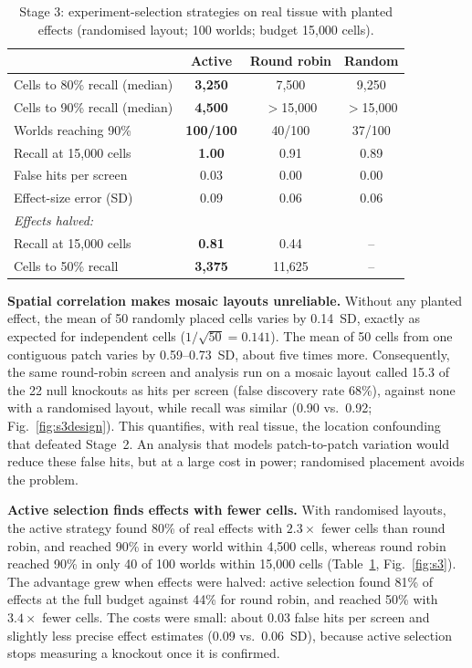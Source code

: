 \documentclass[journal]{IEEEtran}
\begin{document}
\begin{table}[!t]
\centering
\caption{Stage 3: experiment-selection strategies on real tissue with planted effects (randomised layout; 100 worlds; budget 15{,}000 cells).}
\label{tab:s3}
\footnotesize
\setlength{\tabcolsep}{3pt}
\begin{tabular}{lccc}
\toprule
 & Active & Round robin & Random \\
\midrule
Cells to 80\% recall (median) & \textbf{3{,}250} & 7{,}500 & 9{,}250 \\
Cells to 90\% recall (median) & \textbf{4{,}500} & $>$15{,}000 & $>$15{,}000 \\
Worlds reaching 90\% & \textbf{100/100} & 40/100 & 37/100 \\
Recall at 15{,}000 cells & \textbf{1.00} & 0.91 & 0.89 \\
False hits per screen & 0.03 & 0.00 & 0.00 \\
Effect-size error (SD) & 0.09 & 0.06 & 0.06 \\
\midrule
\multicolumn{4}{l}{\emph{Effects halved:}} \\
Recall at 15{,}000 cells & \textbf{0.81} & 0.44 & -- \\
Cells to 50\% recall & \textbf{3{,}375} & 11{,}625 & -- \\
\bottomrule
\end{tabular}
\end{table}

\textbf{Spatial correlation makes mosaic layouts unreliable.} Without any planted effect, the mean of 50 randomly placed cells varies by 0.14~SD, exactly as expected for independent cells ($1/\sqrt{50}=0.141$). The mean of 50 cells from one contiguous patch varies by 0.59--0.73~SD, about five times more. Consequently, the same round-robin screen and analysis run on a mosaic layout called 15.3 of the 22 null knockouts as hits per screen (false discovery rate 68\%), against none with a randomised layout, while recall was similar (0.90 vs.\ 0.92; Fig.~\ref{fig:s3design}). This quantifies, with real tissue, the location confounding that defeated Stage~2. An analysis that models patch-to-patch variation would reduce these false hits, but at a large cost in power; randomised placement avoids the problem.

\textbf{Active selection finds effects with fewer cells.} With randomised layouts, the active strategy found 80\% of real effects with $2.3\times$ fewer cells than round robin, and reached 90\% in every world within 4{,}500 cells, whereas round robin reached 90\% in only 40 of 100 worlds within 15{,}000 cells (Table~\ref{tab:s3}, Fig.~\ref{fig:s3}). The advantage grew when effects were halved: active selection found 81\% of effects at the full budget against 44\% for round robin, and reached 50\% with $3.4\times$ fewer cells. The costs were small: about 0.03 false hits per screen and slightly less precise effect estimates (0.09 vs.\ 0.06~SD), because active selection stops measuring a knockout once it is confirmed.
\end{document}
